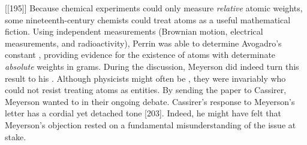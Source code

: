 \documentclass[submitted,12pt]{article}
\begin{document}
[[195]]
%
Because chemical experiments could only measure \emph{relative} atomic weights, some nineteenth-century chemists could treat atoms as a useful mathematical fiction. Using independent measurements (Brownian motion, electrical measurements, and radioactivity), Perrin was able to determine Avogadro's constant \citep[281]{Perrin1910}, providing evidence for the existence of atoms with determinate \emph{absolute} weights in grams. During the discussion, Meyerson did indeed turn this result to his . Although physicists might often be , they were invariably  who could not resist treating atoms as  entities. By sending the paper to Cassirer, Meyerson wanted to  in their ongoing debate. Cassirer’s response to Meyerson’s letter has a cordial yet detached tone [203]. Indeed, he might have felt that Meyerson's objection rested on a fundamental misunderstanding of the issue at stake.
\end{document}
